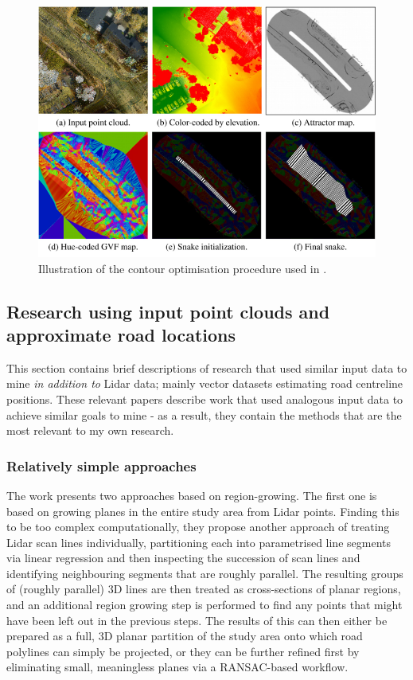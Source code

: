 \begin{figure}
    \centering
    \includegraphics[width=0.75\linewidth]{final_report/figs/boyko_funkahuser_2011_01.png} 
    \caption{Illustration of the contour optimisation procedure used in \cite{boyko_funkhauser_2011}.}
    \label{fig:boykofunkhauser2011}
\end{figure}

\subsection{Research using input point clouds and approximate road locations}
\label{sub:lidaraccuracy_external}

This section contains brief descriptions of research that used similar input data to mine \textit{in addition to} Lidar data; mainly vector datasets estimating road centreline positions. These relevant papers describe work that used analogous input data to achieve similar goals to mine - as a result, they contain the methods that are the most relevant to my own research.

\subsubsection{Relatively simple approaches}

The work \cite{hatger_brenner_2003} presents two approaches based on region-growing. The first one is based on growing planes in the entire study area from Lidar points. Finding this to be too complex computationally, they propose another approach of treating Lidar scan lines individually, partitioning each into parametrised line segments via linear regression and then inspecting the succession of scan lines and identifying neighbouring segments that are roughly parallel. The resulting groups of (roughly parallel) 3D lines are then treated as cross-sections of planar regions, and an additional region growing step is performed to find any points that might have been left out in the previous steps. The results of this can then either be prepared as a full, 3D planar partition of the study area onto which road polylines can simply be projected, or they can be further refined first by eliminating small, meaningless planes via a RANSAC-based workflow.


